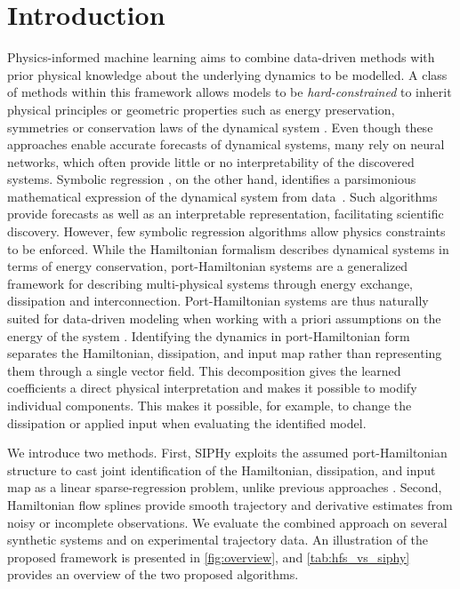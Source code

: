 \documentclass[11pt, a4paper]{article}
\theoremstyle{plain}
\theoremstyle{definition}
\theoremstyle{remark}
\begin{document}
\section{Introduction}

Physics-informed machine learning aims to combine data-driven methods with prior physical knowledge about the underlying dynamics to be modelled. A class of methods within this framework allows models to be \textit{hard-constrained} to inherit physical principles or geometric properties such as energy preservation, symmetries or conservation laws of the dynamical system \cite{greydanusHamiltonianNeuralNetworks2019,offen2024learning,NEURIPS2021_8b519f19}. Even though these approaches enable accurate forecasts of dynamical systems, many rely on neural networks, which often provide little or no interpretability of the discovered systems. Symbolic regression \cite{brunton_discovering_2016,petersen2019deep,cranmer2023interpretable}, on the other hand, identifies a parsimonious mathematical expression of the dynamical system from data~\cite{kutz2022parsimony}. Such algorithms provide forecasts as well as an interpretable representation, facilitating scientific discovery. However, few symbolic regression algorithms allow physics constraints to be enforced.  While the Hamiltonian formalism describes dynamical systems in terms of energy conservation, port-Hamiltonian systems \cite{schaftPortHamiltonianSystemsTheory2014} are a generalized framework for describing multi-physical systems through energy exchange, dissipation and interconnection. Port-Hamiltonian systems are thus naturally suited for data-driven modeling when working with a priori assumptions on the energy of the system \cite{eidnesPseudoHamiltonianNeuralNetworks2023a,rothStablePortHamiltonianNeural2025}. Identifying the dynamics in port-Hamiltonian form separates the Hamiltonian, dissipation, and input map rather than representing them through a single vector field. This decomposition gives the learned coefficients a direct physical interpretation and makes it possible to modify individual components. This makes it possible, for example, to change the dissipation or applied input when evaluating the identified model.


We introduce two methods. First, SIPHy exploits the assumed port-Hamiltonian structure to cast joint identification of the Hamiltonian, dissipation, and input map as a linear sparse-regression problem, unlike previous approaches \cite{leeStructurepreservingSparseIdentification2022}. Second, Hamiltonian flow splines provide smooth trajectory and derivative estimates from noisy or incomplete observations. We evaluate the combined approach on several synthetic systems and on experimental trajectory data. An illustration of the proposed framework is presented in \cref{fig:overview}, and \cref{tab:hfs_vs_siphy} provides an overview of the two proposed algorithms.
\end{document}
